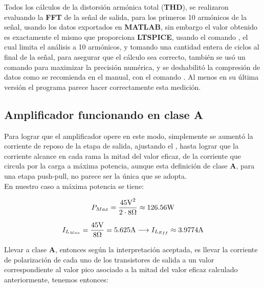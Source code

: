 
Todos los cálculos de la distorsión armónica total (\textbf{THD}), se realizaron evaluando la \textbf{FFT} de la señal de salida, para los primeros \num{10} armónicos de la señal, usando los datos exportados en \textbf{MATLAB}, sin embargo el valor obtenido es exactamente el mismo que proporciona \textbf{LTSPICE}, usando el comando  \mbox{\textbf{}}, el cual limita el análisis a 10 armónicos, y tomando una cantidad entera de ciclos al final de la señal, para asegurar que el cálculo sea correcto, también se usó un comando para maximizar la precisión numérica, \mbox{\textbf{}} y se deshabilitó la compresión de datos como se recomienda en el manual, con el comando \mbox{\textbf{}}. Al menos en su última versión el programa parece hacer correctamente esta medición. 

\subsection{Amplificador funcionando en clase \textbf{A} }

Para lograr que el amplificador opere en este modo, simplemente se aumentó la corriente de reposo de la etapa de salida, ajustando el , hasta lograr que la corriente alcance en cada rama la mitad del valor eficaz, de la corriente que circula por la carga a máxima potencia, aunque esta definición de clase \textbf{A}, para una etapa push-pull, no parece ser la única que se adopta. \\
En nuestro caso a máxima potencia se tiene:

\begin{equation*}
P_{Max} = \frac{{45 \si[per-mode=symbol]{\volt}}^2}{2 \cdot 8\si[per-mode=symbol]{\ohm}} \approx 126.56 \si[per-mode=symbol]{\watt}
\end{equation*}


\begin{equation*}
I_{L_{Max}} = \frac{45 \si[per-mode=symbol]{\volt}}{8\si[per-mode=symbol]{\ohm}} = 5.625 \si[per-mode=symbol]{\ampere} \longrightarrow I_{L_{Eff}} \approx 3.9774 \si[per-mode=symbol]{\ampere}
\end{equation*}


Llevar a clase \textbf{A}, entonces según la interpretación aceptada, es llevar la corriente de polarización de cada uno de los transistores de salida a un valor correspondiente al valor pico asociado a la mitad del valor eficaz calculado anteriormente, tenemos entonces:

